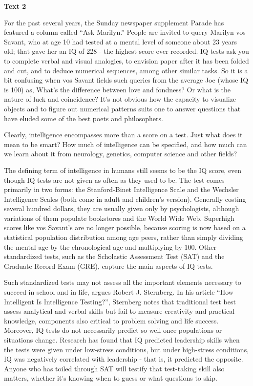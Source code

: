 \begin{center}\textbf{Text 2}\end{center}

\qquad For the past several years, the Sunday newspaper supplement Parade has featured a column called “Ask Marilyn.” People are invited to query Marilyn vos Savant, who at age 10 had tested at a mental level of someone about 23 years old; that gave her an IQ of 228 - the highest score ever recorded. IQ tests ask you to complete verbal and visual analogies, to envision paper after it has been folded and cut, and to deduce numerical sequences, among other similar tasks. So it is a bit confusing when vos Savant fields such queries from the average Joe (whose IQ is 100) as, What’s the difference between love and fondness? Or what is the nature of luck and coincidence? It’s not obvious how the capacity to visualize objects and to figure out numerical patterns suits one to answer questions that have eluded some of the best poets and philosophers.

\qquad Clearly, intelligence encompasses more than a score on a test. Just what does it mean to be smart? How much of intelligence can be specified, and how much can we learn about it from neurology, genetics, computer science and other fields?

\qquad The defining term of intelligence in humans still seems to be the IQ score, even though IQ tests are not given as often as they used to be. The test comes primarily in two forms: the Stanford-Binet Intelligence Scale and the Wechsler Intelligence Scales (both come in adult and children’s version). Generally costing several hundred dollars, they are usually given only by psychologists, although variations of them populate bookstores and the World Wide Web. Superhigh scores like vos Savant’s are no longer possible, because scoring is now based on a statistical population distribution among age peers, rather than simply dividing the mental age by the chronological age and multiplying by 100. Other standardized tests, such as the Scholastic Assessment Test (SAT) and the Graduate Record Exam (GRE), capture the main aspects of IQ tests.

\qquad Such standardized tests may not assess all the important elements necessary to succeed in school and in life, argues Robert J. Sternberg. In his article “How Intelligent Is Intelligence Testing?”, Sternberg notes that traditional test best assess analytical and verbal skills but fail to measure creativity and practical knowledge, components also critical to problem solving and life success. Moreover, IQ tests do not necessarily predict so well once populations or situations change. Research has found that IQ predicted leadership skills when the tests were given under low-stress conditions, but under high-stress conditions, IQ was negatively correlated with leadership - that is, it predicted the opposite. Anyone who has toiled through SAT will testify that test-taking skill also matters, whether it’s knowing when to guess or what questions to skip.

